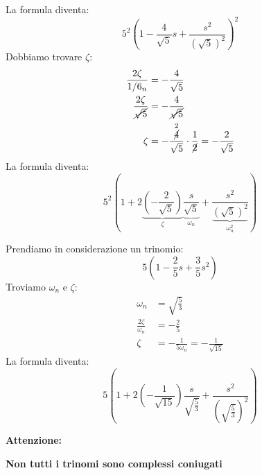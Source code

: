 \documentclass[a4paper]{article}
\begin{document}
\begin{enumerate}
\begin{example}
\[      \] 
      La formula diventa:
      \[
        5^2 \left( 1 - \frac{4}{\sqrt{5}}s + \frac{s^2}{\left( \sqrt{5}  \right)^2} \right)^2
      \] 
      Dobbiamo trovare \( \zeta \):
      \[
      \begin{aligned}
        \frac{2 \zeta}{\omega_n} &= -\frac{4}{\sqrt{5}}\\
        \frac{2 \zeta}{\cancel{\sqrt{5}}} &= -\frac{4}{\cancel{\sqrt{5}}}\\
        \zeta &= -\frac{\stackrel{2}{\cancel{4}}}{\sqrt{5} } \cdot \frac{1}{\cancel{2}} =
        -\frac{2}{\sqrt{5} }
      \end{aligned}
    \]
    La formula diventa:
    \[
      5^2 \left( 1 + 2 \underbrace{\left( -\frac{2}{\sqrt{5} } \right)}_{\zeta} \frac{s}{\underbrace{\sqrt{5}}_{\omega_n} } + \frac{s^2}{\underbrace{\left( \sqrt{5}  \right)^2}_{\omega_n^2}}  \right) 
    \] 
    \end{example}
    \begin{example}
      Prendiamo in considerazione un trinomio:
      \[
      5 \left( 1 - \frac{2}{5}s + \frac{3}{5}s^2 \right) 
      \] 
      Troviamo \( \omega_n \) e \( \zeta \):
      \[
      \begin{aligned}
        \omega_n &= \sqrt{\frac{5}{3}}\\
        \frac{2 \zeta}{\omega_n} &= -\frac{2}{5}\\
        \zeta &= - \frac{1}{5 \omega_n} = -\frac{1}{\sqrt{15} }
      \end{aligned}
      \] 
      La formula diventa:
      \[
        5 \left( 1 + 2 \left( -\frac{1}{\sqrt{15} } \right) \frac{s}{\sqrt{\frac{5}{3}}} + \frac{s^2}{\left( \sqrt{\frac{5}{3}} \right)^2} \right)
      \] 

      \textbf{Attenzione:}

      \noindent
      \textbf{Non tutti i trinomi sono complessi coniugati}
    \end{example}
\end{enumerate}
\end{document}
